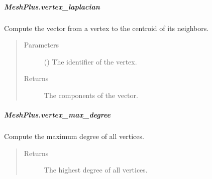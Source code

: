 \documentclass[letterpaper,10pt,english]{sphinxmanual}
\begin{document}
\begin{fulllineitems}
\begin{fulllineitems}
\begin{quote}
\begin{description}
\end{description}\end{quote}

\end{fulllineitems}



\subparagraph{MeshPlus.vertex\_laplacian}
\label{\detokenize{api/generated/directional_clustering.mesh.MeshPlus.vertex_laplacian:meshplus-vertex-laplacian}}\label{\detokenize{api/generated/directional_clustering.mesh.MeshPlus.vertex_laplacian::doc}}

\begin{fulllineitems}
\label{\detokenize{api/generated/directional_clustering.mesh.MeshPlus.vertex_laplacian:directional_clustering.mesh.MeshPlus.vertex_laplacian}}
Compute the vector from a vertex to the centroid of its neighbors.
\begin{quote}\begin{description}
\item[{Parameters}] \leavevmode
{} () \textendash{} The identifier of the vertex.

\item[{Returns}] \leavevmode
{} \textendash{} The components of the vector.

\end{description}\end{quote}

\end{fulllineitems}



\subparagraph{MeshPlus.vertex\_max\_degree}
\label{\detokenize{api/generated/directional_clustering.mesh.MeshPlus.vertex_max_degree:meshplus-vertex-max-degree}}\label{\detokenize{api/generated/directional_clustering.mesh.MeshPlus.vertex_max_degree::doc}}

\begin{fulllineitems}
\label{\detokenize{api/generated/directional_clustering.mesh.MeshPlus.vertex_max_degree:directional_clustering.mesh.MeshPlus.vertex_max_degree}}
Compute the maximum degree of all vertices.
\begin{quote}\begin{description}
\item[{Returns}] \leavevmode
{} \textendash{} The highest degree of all vertices.


\end{description}
\end{quote}
\end{fulllineitems}
\end{fulllineitems}
\end{document}
